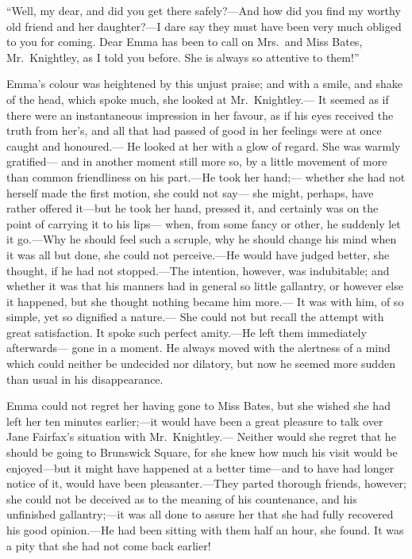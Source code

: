 ``Well, my dear, and did you get there safely?---And how did you
find my worthy old friend and her daughter?---I dare say they must
have been very much obliged to you for coming.  Dear Emma has been
to call on Mrs.\ and Miss Bates, Mr.\ Knightley, as I told you before.
She is always so attentive to them!''

Emma's colour was heightened by this unjust praise; and with a smile,
and shake of the head, which spoke much, she looked at Mr.\ Knightley.---%
It seemed as if there were an instantaneous impression in her favour,
as if his eyes received the truth from her's, and all that had
passed of good in her feelings were at once caught and honoured.---%
He looked at her with a glow of regard.  She was warmly gratified---%
and in another moment still more so, by a little movement of
more than common friendliness on his part.---He took her hand;---%
whether she had not herself made the first motion, she could not say---%
she might, perhaps, have rather offered it---but he took her hand,
pressed it, and certainly was on the point of carrying it to his lips---%
when, from some fancy or other, he suddenly let it go.---Why he should feel
such a scruple, why he should change his mind when it was all but done,
she could not perceive.---He would have judged better, she thought,
if he had not stopped.---The intention, however, was indubitable;
and whether it was that his manners had in general so little gallantry,
or however else it happened, but she thought nothing became him more.---%
It was with him, of so simple, yet so dignified a nature.---%
She could not but recall the attempt with great satisfaction.
It spoke such perfect amity.---He left them immediately afterwards---%
gone in a moment.  He always moved with the alertness of a mind which
could neither be undecided nor dilatory, but now he seemed more sudden
than usual in his disappearance.

Emma could not regret her having gone to Miss Bates, but she wished
she had left her ten minutes earlier;---it would have been a great
pleasure to talk over Jane Fairfax's situation with Mr.\ Knightley.---%
Neither would she regret that he should be going to Brunswick Square,
for she knew how much his visit would be enjoyed---but it might have
happened at a better time---and to have had longer notice of it,
would have been pleasanter.---They parted thorough friends, however;
she could not be deceived as to the meaning of his countenance,
and his unfinished gallantry;---it was all done to assure her that she
had fully recovered his good opinion.---He had been sitting with them
half an hour, she found.  It was a pity that she had not come
back earlier!


